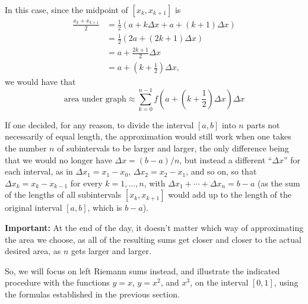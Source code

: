 \documentclass[nooutcomes]{ximera}
\begin{document}
In this case, since the midpoint of $[x_k,x_{k+1}]$ is \begin{align*}\frac{x_k+x_{k+1}}{2} &= \frac{1}{2}(a+k \Delta x + a + (k+1)\Delta x) \\ &= \frac{1}{2}(2a+(2k+1)\Delta x) \\ &= a+ \frac{2k+1}{2}\Delta x \\ &= a + \left(k+\frac{1}{2}\right)\Delta x,\end{align*}we would have that $$\mbox{area under graph} \approx \sum_{k=0}^{n-1} f\left(a + \left(k+\frac{1}{2}\right)\Delta x\right) \Delta x$$

If one decided, for any reason, to divide the interval $[a,b]$ into $n$ parts not necessarily of equal length, the approximation would still work when one takes the number $n$ of subintervals to be larger and larger, the only difference being that we would no longer have $\Delta x = (b-a)/n$, but instead a different ``$\Delta x$'' for each interval, as in $\Delta x_1 = x_1-x_0$, $\Delta x_2= x_2-x_1$, and so on, so that $\Delta x_k = x_k-x_{k-1}$ for every $k=1,\ldots, n$, with $\Delta x_1+\cdots + \Delta x_n = b-a$ (as the sum of the lengths of all subintervals $[x_k,x_{k+1}]$ would add up to the length of the original interval $[a,b]$, which is $b-a$).

\begin{callout}
 {\bf Important:} At the end of the day, it doesn't matter which way of approximating the area we choose, as all of the resulting sums get closer and closer to the actual desired area, as $n$ gets larger and larger.  
\end{callout}

So, we will focus on left Riemann sums instead, and illustrate the indicated procedure with the functions $y=x$, $y=x^2$, and $x^3$, on the interval $[0,1]$, using the formulas established in the previous section.
\end{document}
